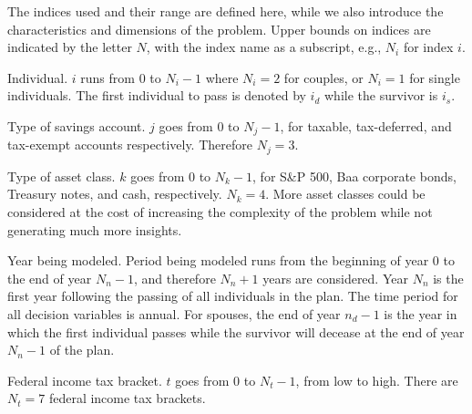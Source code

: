\documentclass{report}[fleqn,12pt]
\begin{document}
The indices used and their range are defined here, while we also
introduce the characteristics and dimensions of the problem.
Upper bounds on indices are indicated by the letter $N$, with the
index name as a subscript, e.g., $N_i$ for index $i$.
\begin{description}[leftmargin=4em,style=multiline]
\item [$i$]
	Individual. $i$ runs from 0 to $N_i - 1$ where $N_i = 2$ for couples,
	or $N_i= 1$ for single individuals. The first individual to pass
		is denoted by $i_d$ while the survivor is $i_s$.
\item [$j$]
	Type of savings account. $j$ goes from 0 to $N_j - 1$, for taxable, tax-deferred,
	and tax-exempt accounts respectively. Therefore $N_j = 3$.
\item[$k$]
	Type of asset class. $k$ goes from 0 to $N_k -1 $, for S\&P 500,
	Baa corporate bonds, Treasury notes, and cash, respectively. $N_k = 4$.
	More asset classes could be considered at the cost of increasing
	the complexity of the problem while not generating much more insights.
\item [$n$]
	Year being modeled. Period being modeled runs from the beginning of year 0 to 
	the end of year $N_n-1$, and therefore $N_n + 1$ years are considered.
	Year $N_n$ is the first year following the passing of all
	individuals in the plan. The time period for all decision variables is annual.
	For spouses, the end of year $n_d-1$ is the year in which the first individual passes while
	the survivor will decease at the end of year $N_n-1$ of the plan.
\item [$t$]
	Federal income tax bracket. $t$ goes from 0 to $N_t - 1$, from low to high.
	There are $N_t = 7$ federal income tax brackets.
\end{description}
\end{document}
